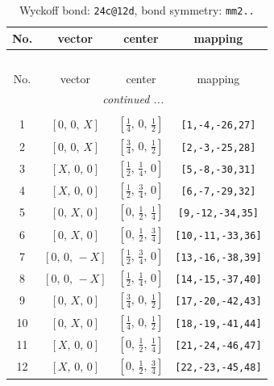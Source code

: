 \documentclass[fleqn,8pt]{jsarticle}
\begin{document}
\renewcommand{\arraystretch}{1.2}
\begin{longtable}{cccc}
\caption{Wyckoff bond: {\tt 24c@12d}, bond symmetry: {\tt mm2..}}
 \\
 \hline \hline
No. & vector & center & mapping \\ \hline \endfirsthead

\multicolumn{3}{l}{\tablename\ \thetable{}} \\
 \hline \hline
No. & vector & center & mapping \\ \hline \endhead

 \hline \hline
\multicolumn{3}{r}{\footnotesize\it continued ...} \\ \endfoot

 \hline \hline
\multicolumn{3}{r}{} \\ \endlastfoot

1 & $\left[ 0,\, 0,\, X \right]$ & $\left[ \frac{1}{4},\, 0,\, \frac{1}{2} \right]$ & {\tt [1,-4,-26,27]} \\ \hline
2 & $\left[ 0,\, 0,\, X \right]$ & $\left[ \frac{3}{4},\, 0,\, \frac{1}{2} \right]$ & {\tt [2,-3,-25,28]} \\ \hline
3 & $\left[ X,\, 0,\, 0 \right]$ & $\left[ \frac{1}{2},\, \frac{1}{4},\, 0 \right]$ & {\tt [5,-8,-30,31]} \\ \hline
4 & $\left[ X,\, 0,\, 0 \right]$ & $\left[ \frac{1}{2},\, \frac{3}{4},\, 0 \right]$ & {\tt [6,-7,-29,32]} \\ \hline
5 & $\left[ 0,\, X,\, 0 \right]$ & $\left[ 0,\, \frac{1}{2},\, \frac{1}{4} \right]$ & {\tt [9,-12,-34,35]} \\ \hline
6 & $\left[ 0,\, X,\, 0 \right]$ & $\left[ 0,\, \frac{1}{2},\, \frac{3}{4} \right]$ & {\tt [10,-11,-33,36]} \\ \hline
7 & $\left[ 0,\, 0,\, - X \right]$ & $\left[ \frac{1}{2},\, \frac{3}{4},\, 0 \right]$ & {\tt [13,-16,-38,39]} \\ \hline
8 & $\left[ 0,\, 0,\, - X \right]$ & $\left[ \frac{1}{2},\, \frac{1}{4},\, 0 \right]$ & {\tt [14,-15,-37,40]} \\ \hline
9 & $\left[ 0,\, X,\, 0 \right]$ & $\left[ \frac{3}{4},\, 0,\, \frac{1}{2} \right]$ & {\tt [17,-20,-42,43]} \\ \hline
10 & $\left[ 0,\, X,\, 0 \right]$ & $\left[ \frac{1}{4},\, 0,\, \frac{1}{2} \right]$ & {\tt [18,-19,-41,44]} \\ \hline
11 & $\left[ X,\, 0,\, 0 \right]$ & $\left[ 0,\, \frac{1}{2},\, \frac{1}{4} \right]$ & {\tt [21,-24,-46,47]} \\ \hline
12 & $\left[ X,\, 0,\, 0 \right]$ & $\left[ 0,\, \frac{1}{2},\, \frac{3}{4} \right]$ & {\tt [22,-23,-45,48]} \\
\end{longtable}
\end{document}
